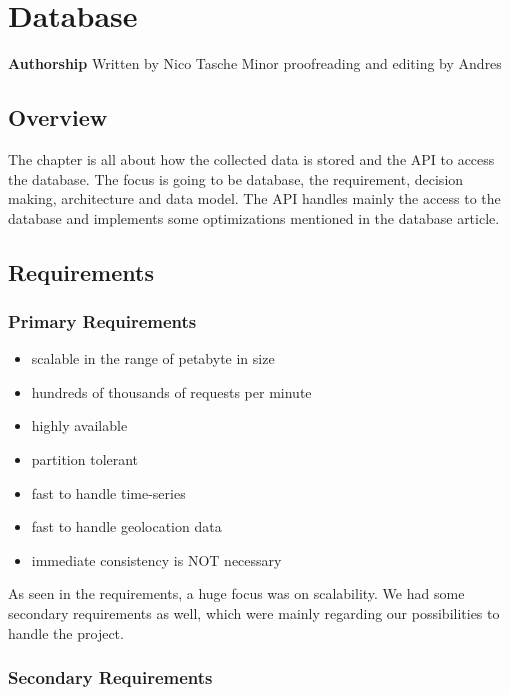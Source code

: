 \section{Database}\label{database}

\textbf{Authorship} Written by Nico Tasche Minor proofreading and
editing by Andres

\subsection{Overview}\label{overview}

The chapter is all about how the collected data is stored and the API to
access the database. The focus is going to be database, the requirement,
decision making, architecture and data model. The API handles mainly the
access to the database and implements some optimizations mentioned in
the database article.

\subsection{Requirements}\label{requirements}

\subsubsection{Primary Requirements}\label{primary-requirements}

\begin{itemize}
\tightlist
\item
  scalable in the range of petabyte in size
\item
  hundreds of thousands of requests per minute
\item
  highly available
\item
  partition tolerant
\item
  fast to handle time-series
\item
  fast to handle geolocation data
\item
  immediate consistency is NOT necessary
\end{itemize}

As seen in the requirements, a huge focus was on scalability. We had
some secondary requirements as well, which were mainly regarding our
possibilities to handle the project.

\subsubsection{Secondary Requirements}\label{secondary-requirements}

